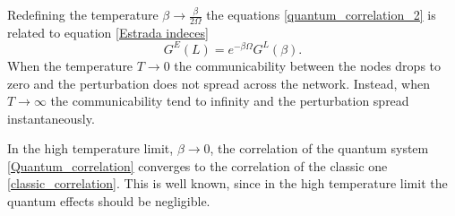 Redefining the temperature $\beta \rightarrow \frac{\beta}{2\Omega}$ the equations \eqref{quantum_correlation_2} is related to equation \eqref{Estrada indeces}
\begin{equation}
    G^E(L) = e^{-\beta\Omega}G^L(\beta).
\end{equation}
When the temperature $T \rightarrow 0$ the communicability between the nodes drops to zero and the perturbation does not spread across the network. Instead, when $T \rightarrow \infty$ the communicability tend to infinity and the perturbation spread instantaneously.  

In the high temperature limit, $\beta \rightarrow 0$, the correlation of the quantum system \eqref{Quantum_correlation} converges to the correlation of the classic one \eqref{classic_correlation}. This is well known, since in the high temperature limit the quantum effects should be negligible.
